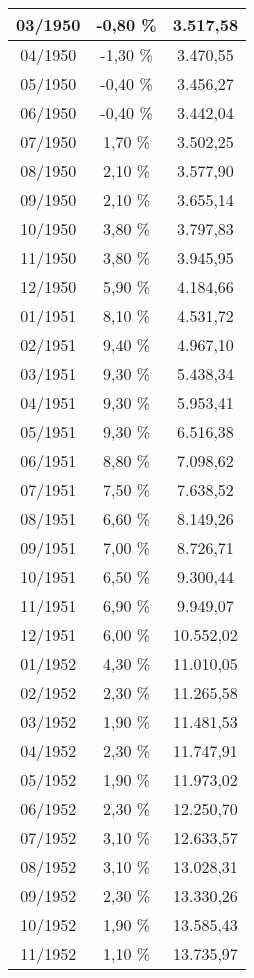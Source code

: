 \begin{center}
\begin{longtable}{|c|c|c|}
03/1950 & -0,80 \% & 3.517,58 \\ \hline
04/1950 & -1,30 \% & 3.470,55 \\ \hline
05/1950 & -0,40 \% & 3.456,27 \\ \hline
06/1950 & -0,40 \% & 3.442,04 \\ \hline
07/1950 & 1,70 \% & 3.502,25 \\ \hline
08/1950 & 2,10 \% & 3.577,90 \\ \hline
09/1950 & 2,10 \% & 3.655,14 \\ \hline
10/1950 & 3,80 \% & 3.797,83 \\ \hline
11/1950 & 3,80 \% & 3.945,95 \\ \hline
12/1950 & 5,90 \% & 4.184,66 \\ \hline
01/1951 & 8,10 \% & 4.531,72 \\ \hline
02/1951 & 9,40 \% & 4.967,10 \\ \hline
03/1951 & 9,30 \% & 5.438,34 \\ \hline
04/1951 & 9,30 \% & 5.953,41 \\ \hline
05/1951 & 9,30 \% & 6.516,38 \\ \hline
06/1951 & 8,80 \% & 7.098,62 \\ \hline
07/1951 & 7,50 \% & 7.638,52 \\ \hline
08/1951 & 6,60 \% & 8.149,26 \\ \hline
09/1951 & 7,00 \% & 8.726,71 \\ \hline
10/1951 & 6,50 \% & 9.300,44 \\ \hline
11/1951 & 6,90 \% & 9.949,07 \\ \hline
12/1951 & 6,00 \% & 10.552,02 \\ \hline
01/1952 & 4,30 \% & 11.010,05 \\ \hline
02/1952 & 2,30 \% & 11.265,58 \\ \hline
03/1952 & 1,90 \% & 11.481,53 \\ \hline
04/1952 & 2,30 \% & 11.747,91 \\ \hline
05/1952 & 1,90 \% & 11.973,02 \\ \hline
06/1952 & 2,30 \% & 12.250,70 \\ \hline
07/1952 & 3,10 \% & 12.633,57 \\ \hline
08/1952 & 3,10 \% & 13.028,31 \\ \hline
09/1952 & 2,30 \% & 13.330,26 \\ \hline
10/1952 & 1,90 \% & 13.585,43 \\ \hline
11/1952 & 1,10 \% & 13.735,97 \\ \hline

\end{longtable}
\end{center}
